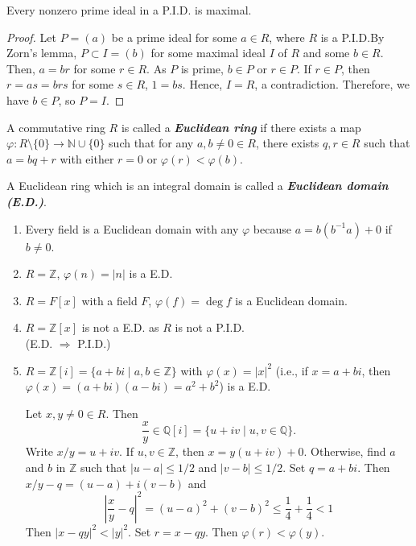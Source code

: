 \documentclass[twoside]{article}
\newcommand\N{\mathbb N}
\newcommand\Z{\mathbb Z}
\newcommand\Q{\mathbb Q}
\theoremstyle{remark}
\newcommand*\term[1]{\textbf{\textit{\mathversion{bold}#1}}}
\begin{document}
\begin{proposition}
  Every nonzero prime ideal in a P.I.D. is maximal.
\end{proposition}

\begin{proof}
  Let \(P = (a)\) be a prime ideal for some \(a \in R\), where \(R\) is a P.I.D.\@ By Zorn's lemma, \(P \subset I = (b)\) for some maximal ideal \(I\) of \(R\) and some \(b \in R\). Then, \(a = br\) for some \(r \in R\). As \(P\) is prime, \(b \in P\) or \(r \in P\). If \(r \in P\), then \(r = as = brs\) for some \(s \in R\), \(1 = bs\). Hence, \(I = R\), a contradiction. Therefore, we have \(b \in P\), so \(P = I\).
\end{proof}

\begin{definition} 
  A commutative ring \(R\) is called a \term{Euclidean ring} if there exists a map \(\varphi: R \setminus \{0\} \to \N \cup \{0\}\) such that for any \(a,b \neq 0 \in R\), there exists \(q,r \in R\) such that \(a = bq+r\) with either \(r=0\) or \(\varphi(r) < \varphi(b)\). \par
  A Euclidean ring which is an integral domain is called a \term{Euclidean domain (E.D.)}.
\end{definition}

\begin{examples}
  \begin{enumerate}[label=\arabic*.]
    \item Every field is a Euclidean domain with any \(\varphi\) because \(a = b(b^{-1}a) + 0\) if \(b \neq 0\).
    \item \(R = \Z\), \(\varphi(n) = |n|\) is a E.D.\@
    \item \(R = F[x]\) with a field \(F\), \(\varphi(f) = \deg f\) is a Euclidean domain.
    \item \(R = \Z[x]\) is not a E.D. as \(R\) is not a P.I.D.\@ \\
    (E.D. \(\Rightarrow\) P.I.D.)
    \item \(R = \Z[i] = \{a + bi \mid a, b \in \Z\}\) with \(\varphi(x) = |x|^2\) (i.e., if \(x = a+bi\), then \(\varphi(x) = (a+bi)(a-bi) = a^2+b^2\)) is a E.D.\@ \par
    Let \(x,y \neq 0 \in R\). Then
    \[ \frac xy \in \Q[i] = \{u + iv \mid u,v \in \Q\}. \]
    Write \(x/y = u + iv\). If \(u,v \in \Z\), then \(x = y(u+iv) + 0\). Otherwise, find \(a\) and \(b\) in \(\Z\) such that \(|u-a| \leq 1/2\) and \(|v-b| \leq 1/2\). Set \(q = a+bi\). Then \(x/y - q = (u-a) + i(v-b)\) and
    \[ \left| \frac xy - q \right|^2 = (u-a)^2 + (v-b)^2 \leq \frac14 + \frac14 < 1 \]
    Then \(|x-qy|^2 < |y|^2\). Set \(r = x-qy\). Then \(\varphi(r) < \varphi(y)\).
  \end{enumerate}
\end{examples}
\end{document}
